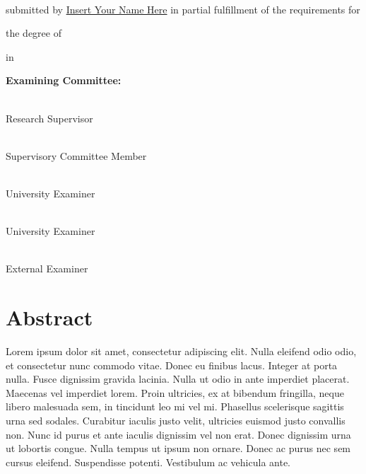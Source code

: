 \documentclass[]{article}
\numberwithin{equation}{section}
\begin{document}
\vspace{5mm}

\noindent\underline{}\\
\vspace{2mm}

submitted by \underline{Insert Your Name Here} in partial fulfillment of the requirements for

the degree of \noindent\underline{}

in \noindent\underline{}

\vspace{5mm}

\textbf{Examining Committee:}

\noindent\underline{}\\
Research Supervisor

\noindent\underline{}\\
Supervisory Committee Member

\noindent\underline{}\\
University Examiner

\noindent\underline{}\\
University Examiner

\noindent\underline{}\\
External Examiner

\clearpage

\setlength{\parindent}{4em} 
\linespread{1}
\doublespacing

\section*{Abstract}

Lorem ipsum dolor sit amet, consectetur adipiscing elit. Nulla eleifend odio odio, et consectetur nunc commodo vitae. Donec eu finibus lacus. Integer at porta nulla. Fusce dignissim gravida lacinia. Nulla ut odio in ante imperdiet placerat. Maecenas vel imperdiet lorem. Proin ultricies, ex at bibendum fringilla, neque libero malesuada sem, in tincidunt leo mi vel mi. Phasellus scelerisque sagittis urna sed sodales. Curabitur iaculis justo velit, ultricies euismod justo convallis non. Nunc id purus et ante iaculis dignissim vel non erat. Donec dignissim urna ut lobortis congue. Nulla tempus ut ipsum non ornare. Donec ac purus nec sem cursus eleifend. Suspendisse potenti. Vestibulum ac vehicula ante.
\end{document}
